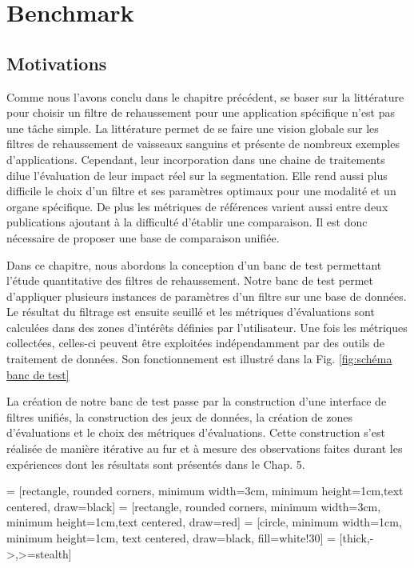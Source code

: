 %

\chapter{Benchmark}
\label{sec:Benchmark}


\section{Motivations}
\label{sec:Benchmark}

Comme nous l'avons conclu dans le chapitre précédent, se baser sur la littérature pour choisir un filtre de rehaussement pour une application spécifique n'est pas une tâche simple. La littérature permet de se faire une vision globale sur les filtres de rehaussement de vaisseaux sanguins et présente de nombreux exemples d'applications. Cependant, leur incorporation dans une chaine de traitements dilue l'évaluation de leur impact réel sur la segmentation. Elle rend aussi plus difficile le choix d'un filtre et ses paramètres optimaux pour une modalité et un organe spécifique. De plus les métriques de références varient aussi entre deux publications ajoutant à la difficulté d'établir une comparaison. Il est donc nécessaire de proposer une base de comparaison unifiée.

Dans ce chapitre, nous abordons la conception d'un banc de test permettant l'étude quantitative des filtres de rehaussement. Notre banc de test permet d'appliquer plusieurs instances de paramètres d'un filtre sur une base de données. Le résultat du filtrage est ensuite seuillé et les métriques d'évaluations sont calculées dans des zones d'intérêts définies par l'utilisateur. Une fois les métriques collectées, celles-ci peuvent être exploitées indépendamment par des outils de traitement de données. Son fonctionnement est illustré dans la Fig. \ref{fig:schéma banc de test}

La création de notre banc de test passe par la construction d'une interface de filtres unifiés, la construction des jeux de données, la création de zones d'évaluations et le choix des métriques d'évaluations. Cette construction s'est réalisée de manière itérative au fur et à mesure des observations faites durant les expériences dont les résultats sont présentés dans le Chap. 5.

 = [rectangle, rounded corners, minimum width=3cm, minimum height=1cm,text centered, draw=black]
 = [rectangle, rounded corners, minimum width=3cm, minimum height=1cm,text centered, draw=red]
 = [circle, minimum width=1cm, minimum height=1cm, text centered, draw=black, fill=white!30]
 = [thick,->,>=stealth]

